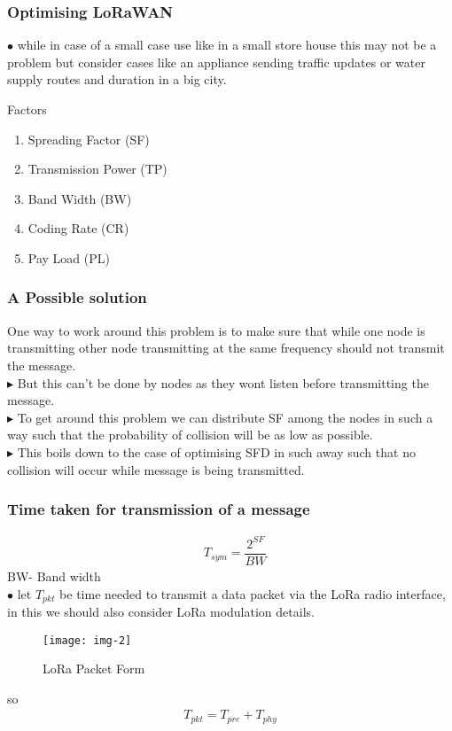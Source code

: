 \documentclass{beamer}
\begin{document}
\begin{frame}
\frametitle{Optimising LoRaWAN}
$\bullet$ while in case of a small case use like in a small store house this may not be a problem but consider cases like an appliance sending traffic updates or water supply routes and duration in a big city.
\begin{block}{Factors}
\begin{enumerate}
\item Spreading Factor (SF)
\item Transmission Power (TP)
\item Band Width (BW)
\item Coding Rate (CR)
\item Pay Load (PL)
\end{enumerate}
\end{block}

\end{frame}


\begin{frame}
\frametitle{A Possible solution}
 
 One way to work around this problem is to make sure that while one node is transmitting other node transmitting at the same frequency should not transmit the message.\\
$\blacktriangleright$ But this can't be done by nodes as they wont listen before transmitting the message.\\
$\blacktriangleright$ To get around this problem we can distribute SF among the nodes in such a way such that the probability of collision will be as low as possible.\\
$\blacktriangleright$ This boils down to the case of optimising SFD in such away such that no collision will occur while message is being transmitted.\\ 

\end{frame}


\begin{frame}
\frametitle{Time taken for transmission of a message}
\begin{align}
&T_{sym}=\dfrac{2^{SF}}{BW}
\end{align}
BW- Band width\\
$\bullet$ let $T_{pkt}$ be time needed to transmit a data packet via the LoRa radio interface, in this we should also consider LoRa modulation details.
\begin{figure}[h]
    \centering
    \texttt{[image: img-2]}
    \caption{LoRa Packet Form}
\end{figure}
so
\begin{align}
T_{pkt}=T_{pre}+T_{phy}
\end{align}

\end{frame}
\end{document}
